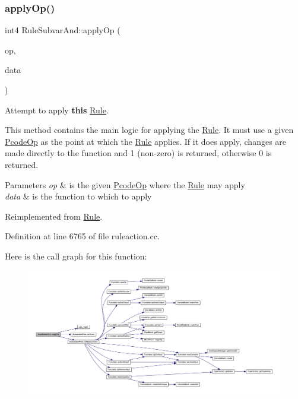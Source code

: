 \subsubsection{\texorpdfstring{applyOp()}{applyOp()}}
{\footnotesize\ttfamily int4 Rule\+Subvar\+And\+::apply\+Op (\begin{DoxyParamCaption}\item[{\mbox{\hyperlink{class_pcode_op}{Pcode\+Op}} $\ast$}]{op,  }\item[{\mbox{\hyperlink{class_funcdata}{Funcdata}} \&}]{data }\end{DoxyParamCaption})\hspace{0.3cm}{\ttfamily [virtual]}}



Attempt to apply {\bfseries{this}} \mbox{\hyperlink{class_rule}{Rule}}. 

This method contains the main logic for applying the \mbox{\hyperlink{class_rule}{Rule}}. It must use a given \mbox{\hyperlink{class_pcode_op}{Pcode\+Op}} as the point at which the \mbox{\hyperlink{class_rule}{Rule}} applies. If it does apply, changes are made directly to the function and 1 (non-\/zero) is returned, otherwise 0 is returned. 
\begin{DoxyParams}{Parameters}
{\em op} & is the given \mbox{\hyperlink{class_pcode_op}{Pcode\+Op}} where the \mbox{\hyperlink{class_rule}{Rule}} may apply \\
\hline
{\em data} & is the function to which to apply \\
\hline
\end{DoxyParams}


Reimplemented from \mbox{\hyperlink{class_rule_a4e3e61f066670175009f60fb9dc60848}{Rule}}.



Definition at line 6765 of file ruleaction.\+cc.

Here is the call graph for this function\+:
\nopagebreak
\begin{figure}[H]
\begin{center}
\leavevmode
\includegraphics[width=350pt]{class_rule_subvar_and_a8537105bf8b9f97d9d312e84b7f2b39b_cgraph}
\end{center}
\end{figure}
\mbox{\label{class_rule_subvar_and_a342d056bd7dddb26c80742c518f74ea9}} 
